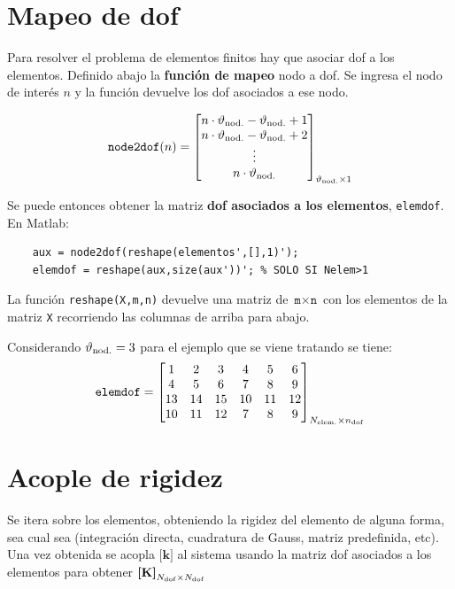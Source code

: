 \documentclass[11pt, a4paper,titlepage]{article}
\newcommand{\rmfont}[1]{{\fontfamily{ptm}\selectfont%
#1}}
\newcommand{\Matlab}{\rmfont{\sc Matlab}}
\newcommand{\Mme}[1]{\boldsymbol{[}\mathbf{#1} \boldsymbol{]}}
\newcommand{\MK}{\Mme{K}}
\newcommand{\Mk}{\Mme{k}}
\begin{document}
\section{Mapeo de dof}

Para resolver el problema de elementos finitos hay que asociar dof a los elementos. Definido abajo la \textbf{función de mapeo} nodo a dof. Se ingresa el nodo de interés $n$ y la función devuelve los dof asociados a ese nodo.

\begin{equation}
	\texttt{node2dof}(n) = \begin{bmatrix}
	n\cdot\vartheta_{\mathrm{nod.}}-\vartheta_{\mathrm{nod.}} +1 \\ n\cdot\vartheta_{\mathrm{nod.}}-\vartheta_{\mathrm{nod.}} +2 \\ \vdots \\ n\cdot\vartheta_{\mathrm{nod.}}
	\end{bmatrix}_{\vartheta_{\mathrm{nod.}}\times 1}
\end{equation}

Se puede entonces obtener la matriz \textbf{dof asociados a los elementos}, \texttt{elemdof}. En \Matlab:
\begin{verbatim}
    aux = node2dof(reshape(elementos',[],1)');
    elemdof = reshape(aux,size(aux'))'; % SOLO SI Nelem>1
\end{verbatim}

La función \texttt{reshape(X,m,n)} devuelve una matriz de $\texttt{m}\times\texttt{n}$ con los elementos de la matriz \texttt{X} recorriendo las columnas de arriba para abajo.

Considerando $\vartheta_{\mathrm{nod.}}=3$ para el ejemplo que se viene tratando se tiene:
\begin{equation} \label{eq:MatrizElemdofEjemplo}
\texttt{elemdof} = \begin{bmatrix}
1 & 2 & 3 & 4 & 5 & 6 \\
4 & 5 & 6 & 7 & 8 & 9  \\
13 & 14 & 15 & 10 & 11 & 12 \\
10 & 11 & 12 & 7 & 8 & 9 
\end{bmatrix}_{ N_{\mathrm{elem.}} \times n_{\mathrm{dof}} } 
\end{equation}

\section{Acople de rigidez}
Se itera sobre los elementos, obteniendo la rigidez del elemento de alguna forma, sea cual sea (integración directa, cuadratura de Gauss, matriz predefinida, etc). Una vez obtenida se acopla $\Mk$ al sistema usando la matriz dof asociados a los elementos para obtener $\MK_{\Ndof \times \Ndof}$
\end{document}
